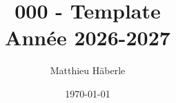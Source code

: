\documentclass[a4paper, 12pt]{report}
\title{
	{\Huge 000 - Template \\ }
	{\huge Année 2026-2027}
}
\author{\Large{Matthieu Häberle}}
\date{\today}
\begin{document}
\maketitle
\newpage
\twocolstableofcontents
\pagebreak






\end{document}
